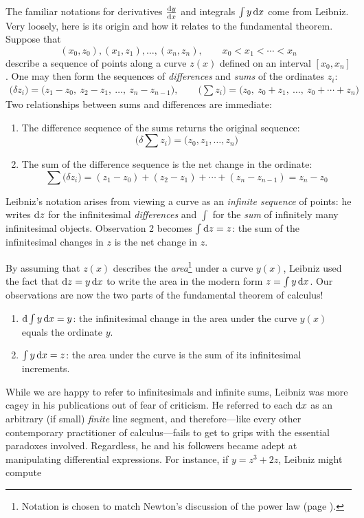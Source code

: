 The familiar notations for derivatives $\diff[y]{x}$ and integrals $\int y\,\dx$ come from Leibniz. Very loosely, here is its origin and how it relates to the fundamental theorem. Suppose that
\[
	(x_0,z_0),(x_1,z_1),\ldots,(x_n,z_n),\qquad x_0<x_1<\cdots<x_n
\]
describe a sequence of points along a curve $z(x)$ defined on an interval $[x_0,x_n]$. One may then form the sequences of \emph{differences} and \emph{sums} of the ordinates $z_i$:
\begin{gather*}
	\bigl(\delta z_i\bigr)=\bigl(z_1-z_0,\ z_2-z_1,\ \ldots,\ z_n-z_{n-1}\bigr),\qquad
	\bigl(\sum z_i\bigr) =\bigl(z_0,\ z_0+z_1,\ \ldots,\ z_0+\cdots+z_n\bigr)
\end{gather*}
Two relationships between sums and differences are immediate:
\begin{enumerate}
	\item The difference sequence of the sums returns the original sequence:
	\[
		\bigl(\delta\sum z_i\bigr)=\bigl(z_0,z_1,\ldots,z_n\bigr)
	\]
	\item The sum of the difference sequence is the net change in the ordinate:
	\[
		\sum\bigl(\delta z_i\bigr)=(z_1-z_0)+(z_2-z_1)+\cdots +(z_n-z_{n-1}) =z_n-z_0
	\]
\end{enumerate}
Leibniz's notation arises from viewing a curve as an \emph{infinite sequence} of points: he writes $\dz$ for the infinitesimal \emph{differences} and $\int$ for the \emph{sum} of infinitely many infinitesimal objects. Observation 2 becomes $\int \dz=z$: the sum of the infinitesimal changes in $z$ is the net change in $z$.\par
By assuming that $z(x)$ describes the \emph{area}\footnote{Notation is chosen to match Newton's discussion of the power law (page \pageref{pg:newtonpowerlaw}).} under a curve $y(x)$, Leibniz used the fact that $\dz=y\,\dx$ to write the area in the modern form $z=\int y\,\dx$. Our observations are now the two parts of the fundamental theorem of calculus!
\begin{enumerate}
  \item $\D\int y\,\dx=y$: the infinitesimal change in the area under the curve $y(x)$ equals the ordinate $y$.
  \item $\int y\,\dx=z$: the area under the curve is the sum of its infinitesimal increments.
\end{enumerate}
While we are happy to refer to infinitesimals and infinite sums, Leibniz was more cagey in his publications out of fear of criticism. He referred to each $\dx$ as an arbitrary (if small) \emph{finite} line segment, and therefore---like every other contemporary practitioner of calculus---fails to get to grips with the essential paradoxes involved. Regardless, he and his followers became adept at manipulating differential expressions. For instance, if $y=z^3+2z$, Leibniz might compute
